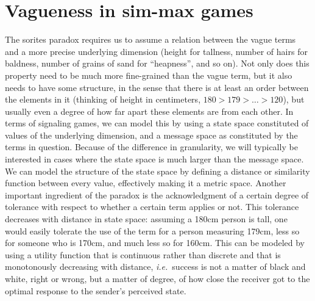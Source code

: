 \documentclass[a4paper]{article}
\begin{document}
\section{Vagueness in sim-max games}
\label{sec:sim-max-vagueness}

The sorites paradox requires us to assume a relation between the vague terms and a more precise underlying dimension (height for tallness, number of hairs for baldness, number of grains of sand for ``heapness'', and so on).
Not only does this property need to be much more fine-grained than the vague term, but it also needs to have some structure, in the sense that there is at least an order between the elements in it (thinking of height in centimeters, $180 > 179 > \ldots > 120$), but usually even a degree of how far apart these elements are from each other.
In terms of signaling games, we can model this by using a state space constituted of values of the underlying dimension, and a message space as constituted by the terms in question.
Because of the difference in granularity, we will typically be interested in cases where the state space is much larger than the message space.
We can model the structure of the state space by defining a distance or similarity function between every value, effectively making it a metric space.
Another important ingredient of the paradox is the acknowledgment of a certain degree of tolerance with respect to whether a certain term applies or not.
This tolerance decreases with distance in state space: assuming a 180cm person is tall, one would easily tolerate the use of the term for a person measuring 179cm, less so for someone who is 170cm, and much less so for 160cm.
This can be modeled by using a utility function that is continuous rather than discrete and that is monotonously decreasing with distance, \emph{i.e.}~success is not a matter of black and white, right or wrong, but a matter of degree, of how close the receiver got to the optimal response to the sender's perceived state.
\end{document}

